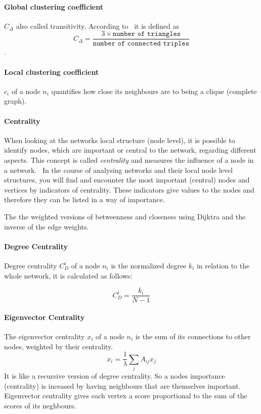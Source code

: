 \paragraph{Global clustering coefficient} $C_\Delta$ also called transitivity. According to~\textcite{wasserman1994social} it is defined as $$C_\Delta = \frac{3 \times \texttt{number of triangles}}{\texttt{number of connected triples}}$$.

\paragraph{Local clustering coefficient} $c_i$ of a node $n_i$ quantifies how close its neighbours are to being a clique (complete graph).

\paragraph{Centrality}
When looking at the networks local structure (node level), it is possible to identify nodes, which are important or central to the network, regarding different aspects. This concept is called \emph{centrality} and measures the influence of a node in a network.~\cite{newman2010networks}
In the course of analysing networks and their local node level structures, you will find and encounter the most important (central) nodes and vertices by indicators of centrality. These indicators give values to the nodes and therefore they can be listed in a way of importance.

The the weighted versions of betweenness and closeness using Dijktra and the inverse of the edge weights.

\paragraph{Degree Centrality}
Degree centrality $C^i_D$ of a node $n_i$ is the normalized degree $k_i$ in relation to the whole network, it is calculated as follows:

$$C^i_D=\frac{k_i}{N-1}$$

\paragraph{Eigenvector Centrality}
The eigenvector centrality $x_i$ of a node $n_i$ is the sum of its connections to other nodes, weighted by their centrality.
$$x_i= \frac{1}{\lambda}\sum_{j}A_{ij}x_j$$
It is like a recursive version of degree centrality. So a nodes importance (centrality) is inceased by having neighbours that are themselves important. Eigenvector centrality gives each vertex a score proportional to the sum of the scores of its neghbours.~\cite{newman2010networks}

